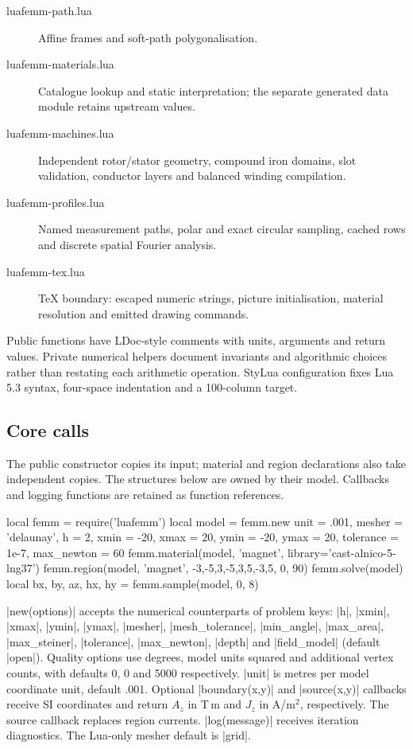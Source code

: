 \begin{description}
\item[luafemm-path.lua] Affine frames and soft-path polygonalisation.
\item[luafemm-materials.lua] Catalogue lookup and static interpretation;
  the separate generated data module retains upstream values.
\item[luafemm-machines.lua] Independent rotor/stator geometry, compound iron
  domains, slot validation, conductor layers and balanced winding compilation.
\item[luafemm-profiles.lua] Named measurement paths, polar and exact circular
  sampling, cached rows and discrete spatial Fourier analysis.
\item[luafemm-tex.lua] TeX boundary: escaped numeric strings, picture
  initialisation, material resolution and emitted drawing commands.
\end{description}
Public functions have LDoc-style comments with units, arguments and
return values. Private numerical helpers document invariants and algorithmic
choices rather than restating each arithmetic operation. StyLua configuration
fixes Lua 5.3 syntax, four-space indentation and a 100-column target.

\subsection{Core calls}
The public constructor copies its input; material and region declarations
also take independent copies. The structures below are owned by their model.
Callbacks and logging functions are retained as function references.
\begin{codeexample}
local femm = require('luafemm')
local model = femm.new {
  unit = .001, mesher = 'delaunay', h = 2,
  xmin = -20, xmax = 20, ymin = -20, ymax = 20,
  tolerance = 1e-7, max_newton = 60
}
femm.material(model, 'magnet', {library='cast-alnico-5-lng37'})
femm.region(model, 'magnet', {{-3,-5},{3,-5},{3,5},{-3,5}}, 0, 90)
femm.solve(model)
local bx, by, az, hx, hy = femm.sample(model, 0, 8)
\end{codeexample}

|new(options)| accepts the numerical counterparts of problem keys:
|h|, |xmin|, |xmax|, |ymin|, |ymax|, |mesher|, |mesh_tolerance|,
|min_angle|, |max_area|, |max_steiner|, |tolerance|, |max_newton|,
|depth| and |field_model| (default |open|).
Quality options use degrees, model units squared and additional vertex counts,
with defaults 0, 0 and 5000 respectively. |unit| is metres per model coordinate unit,
default .001. Optional |boundary(x,y)| and |source(x,y)| callbacks receive
SI coordinates and return $A_z$ in T\,m and $J_z$ in A/m$^2$, respectively.
The source callback replaces region currents. |log(message)| receives
iteration diagnostics. The Lua-only mesher default is |grid|.

